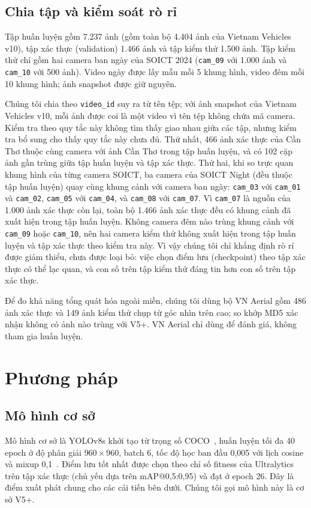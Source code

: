 \documentclass[10pt,journal,a4paper]{IEEEtran}
\begin{document}
\subsection{Chia tập và kiểm soát rò rỉ}
Tập huấn luyện gồm 7.237 ảnh (gồm toàn bộ 4.404 ảnh của Vietnam Vehicles v10), tập xác thực (validation) 1.466 ảnh và tập kiểm thử 1.500 ảnh. Tập kiểm thử chỉ gồm hai camera ban ngày của SOICT 2024 (\texttt{cam\_09} với 1.000 ảnh và \texttt{cam\_10} với 500 ảnh). Video ngày được lấy mẫu mỗi 5 khung hình, video đêm mỗi 10 khung hình; ảnh snapshot được giữ nguyên.

Chúng tôi chia theo \texttt{video\_id} suy ra từ tên tệp; với ảnh snapshot của Vietnam Vehicles v10, mỗi ảnh được coi là một video vì tên tệp không chứa mã camera. Kiểm tra theo quy tắc này không tìm thấy giao nhau giữa các tập, nhưng kiểm tra bổ sung cho thấy quy tắc này chưa đủ. Thứ nhất, 466 ảnh xác thực của Cần Thơ thuộc cùng camera với ảnh Cần Thơ trong tập huấn luyện, và có 102 cặp ảnh gần trùng giữa tập huấn luyện và tập xác thực. Thứ hai, khi so trực quan khung hình của từng camera SOICT, ba camera của SOICT Night (đều thuộc tập huấn luyện) quay cùng khung cảnh với camera ban ngày: \texttt{cam\_03} với \texttt{cam\_01} và \texttt{cam\_02}, \texttt{cam\_05} với \texttt{cam\_04}, và \texttt{cam\_08} với \texttt{cam\_07}. Vì \texttt{cam\_07} là nguồn của 1.000 ảnh xác thực còn lại, toàn bộ 1.466 ảnh xác thực đều có khung cảnh đã xuất hiện trong tập huấn luyện. Không camera đêm nào trùng khung cảnh với \texttt{cam\_09} hoặc \texttt{cam\_10}, nên hai camera kiểm thử không xuất hiện trong tập huấn luyện và tập xác thực theo kiểm tra này. Vì vậy chúng tôi chỉ khẳng định rò rỉ được giảm thiểu, chưa được loại bỏ: việc chọn điểm lưu (checkpoint) theo tập xác thực có thể lạc quan, và con số trên tập kiểm thử đáng tin hơn con số trên tập xác thực.

Để đo khả năng tổng quát hóa ngoài miền, chúng tôi dùng bộ VN Aerial gồm 486 ảnh xác thực và 149 ảnh kiểm thử chụp từ góc nhìn trên cao; so khớp MD5 xác nhận không có ảnh nào trùng với V5+. VN Aerial chỉ dùng để đánh giá, không tham gia huấn luyện.

\section{Phương pháp}
\subsection{Mô hình cơ sở}
Mô hình cơ sở là YOLOv8s khởi tạo từ trọng số COCO~\cite{coco}, huấn luyện tối đa 40 epoch ở độ phân giải $960 \times 960$, batch 6, tốc độ học ban đầu 0,005 với lịch cosine và mixup 0,1~\cite{mixup}. Điểm lưu tốt nhất được chọn theo chỉ số fitness của Ultralytics trên tập xác thực (chủ yếu dựa trên mAP@0,5:0,95) và đạt ở epoch 26. Đây là điểm xuất phát chung cho các cải tiến bên dưới. Chúng tôi gọi mô hình này là cơ sở V5+.
\end{document}

